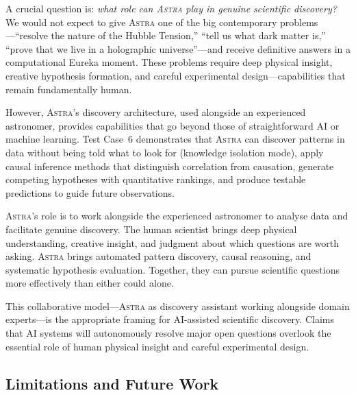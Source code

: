 \documentclass[usenatbib]{rasti}
\newcommand{\astra}{\textsc{Astra}\xspace}
\begin{document}
A crucial question is: \emph{what role can \astra play in genuine scientific discovery?}
We would not expect to give \astra one of the big contemporary problems---``resolve the nature of the Hubble Tension,'' ``tell us what dark matter is,'' ``prove that we live in a holographic universe''---and receive definitive answers in a computational Eureka moment.
These problems require deep physical insight, creative hypothesis formation, and careful experimental design---capabilities that remain fundamentally human.

However, \astra's discovery architecture, used alongside an experienced astronomer, provides capabilities that go beyond those of straightforward AI or machine learning.
Test Case~6 demonstrates that \astra can discover patterns in data without being told what to look for (knowledge isolation mode), apply causal inference methods that distinguish correlation from causation, generate competing hypotheses with quantitative rankings, and produce testable predictions to guide future observations.

\astra's role is to work alongside the experienced astronomer to analyse data and facilitate genuine discovery.
The human scientist brings deep physical understanding, creative insight, and judgment about which questions are worth asking.
\astra brings automated pattern discovery, causal reasoning, and systematic hypothesis evaluation.
Together, they can pursue scientific questions more effectively than either could alone.

This collaborative model---\astra as discovery assistant working alongside domain experts---is the appropriate framing for AI-assisted scientific discovery.
Claims that AI systems will autonomously resolve major open questions overlook the essential role of human physical insight and careful experimental design.

\subsection{Limitations and Future Work}
\label{sec:discussion:limitations}
\end{document}
